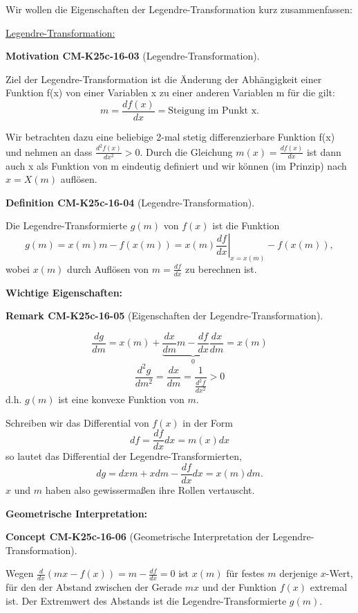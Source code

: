\documentclass[10pt, letterpaper]{article}
\newcommand{\CustomHeading}[3]{%
  \par\medskip\noindent%
  \textbf{#1 #2} \textnormal{(#3)}.\enskip%
}
\newenvironment{DEF}[2]{\begin{unitbox}\CustomHeading{Definition}{#1}{#2}}{\end{unitbox}}
\newenvironment{REM}[2]{\begin{unitbox}\CustomHeading{Remark}{#1}{#2}}{\end{unitbox}}
\newenvironment{CONC}[2]{\begin{unitbox}\CustomHeading{Concept}{#1}{#2}}{\end{unitbox}}
\newenvironment{MOT}[2]{\begin{unitbox}\CustomHeading{Motivation}{#1}{#2}}{\end{unitbox}}
\begin{document}
Wir wollen die Eigenschaften der Legendre-Transformation kurz zusammenfassen:

\underline{Legendre-Transformation:}


\begin{MOT}{CM-K25c-16-03}{Legendre-Transformation}
Ziel der Legendre-Transformation ist die Änderung der Abhängigkeit einer Funktion f(x) von einer Variablen x zu einer anderen Variablen m für die gilt:
\[
m = \frac{df(x)}{dx} = \text{Steigung im Punkt x.}
\]

Wir betrachten dazu eine beliebige 2-mal stetig differenzierbare Funktion f(x) und nehmen an dass $\frac{d^2f(x)}{dx^2} > 0$. Durch die Gleichung $m(x) = \frac{df(x)}{dx}$ ist dann auch x als Funktion von m eindeutig definiert und wir können (im Prinzip) nach $x = X(m)$ auflösen.
\end{MOT}



\begin{DEF}{CM-K25c-16-04}{Legendre-Transformation}
Die Legendre-Transformierte $g(m)$ von $f(x)$ ist die Funktion
\[
g(m) = x(m)m - f(x(m)) = x(m)\left.\frac{df}{dx}\right|_{x=x(m)} - f(x(m)),
\]
wobei $x(m)$ durch Auflösen von $m = \frac{df}{dx}$ zu berechnen ist.
\end{DEF}


\textbf{Wichtige Eigenschaften:}

\begin{REM}{CM-K25c-16-05}{Eigenschaften der Legendre-Transformation}
\[
\frac{dg}{dm} = x(m) + \underbrace{\frac{dx}{dm}m - \frac{df}{dx}\frac{dx}{dm}}_{0} = x(m)
\]
\[
\frac{d^2g}{dm^2} = \frac{dx}{dm} = \frac{1}{\frac{d^2f}{dx^2}} > 0
\]
d.h. $g(m)$ ist eine konvexe Funktion von $m$.

Schreiben wir das Differential von $f(x)$ in der Form
\[
df = \frac{df}{dx}dx = m(x)dx
\]
so lautet das Differential der Legendre-Transformierten,
\[
dg = dxm + xdm - \frac{df}{dx}dx = x(m)dm.
\]
$x$ und $m$ haben also gewissermaßen ihre Rollen vertauscht.
\end{REM}

\textbf{Geometrische Interpretation:}

\begin{CONC}{CM-K25c-16-06}{Geometrische Interpretation der Legendre-Transformation}
Wegen $\frac{d}{dx}(mx-f(x))=m-\frac{df}{dx}=0$ ist $x(m)$ für festes $m$ derjenige $x$-Wert, für den der Abstand zwischen der Gerade $mx$ und der Funktion $f(x)$ extremal ist. Der Extremwert des Abstands ist die Legendre-Transformierte $g(m)$.
\end{CONC}
\end{document}
